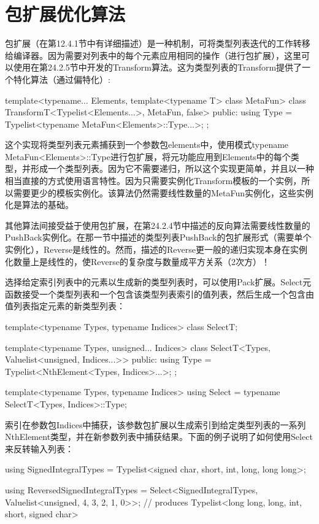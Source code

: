 \section{包扩展优化算法}
包扩展（在第12.4.1节中有详细描述）是一种机制，可将类型列表迭代的工作转移给编译器。因为需要对列表中的每个元素应用相同的操作（进行包扩展），这里可以使用在第24.2.5节中开发的Transform算法。这为类型列表的Transform提供了一个特化算法（通过偏特化）:

\begin{cpp}
template<typename... Elements, template<typename T> class MetaFun>
class TransformT<Typelist<Elements...>, MetaFun, false> {
	public:
	using Type = Typelist<typename MetaFun<Elements>::Type...>;
};
\end{cpp}

这个实现将类型列表元素捕获到一个参数包elements中，使用模式typename MetaFun<Elements>::Type进行包扩展，将元功能应用到Elements中的每个类型，并形成一个类型列表。因为它不需要递归，所以这个实现更简单，并且以一种相当直接的方式使用语言特性。因为只需要实例化Transform模板的一个实例，所以需要更少的模板实例化。该算法仍然需要线性数量的MetaFun实例化，这些实例化是算法的基础。

其他算法间接受益于使用包扩展，在第24.2.4节中描述的反向算法需要线性数量的PushBack实例化。在那一节中描述的类型列表PushBack的包扩展形式（需要单个实例化），Reverse是线性的。然而，描述的Reverse更一般的递归实现本身在实例化数量上是线性的，使Reverse的复杂度与数量成平方关系（2次方）！

选择给定索引列表中的元素以生成新的类型列表时，可以使用Pack扩展。Select元函数接受一个类型列表和一个包含该类型列表索引的值列表，然后生成一个包含由值列表指定元素的新类型列表：

\begin{cpp}
template<typename Types, typename Indices>
class SelectT;

template<typename Types, unsigned... Indices>
class SelectT<Types, Valuelist<unsigned, Indices...>> {
	public:
	using Type = Typelist<NthElement<Types, Indices>...>;
};

template<typename Types, typename Indices>
using Select = typename SelectT<Types, Indices>::Type;
\end{cpp}

索引在参数包Indices中捕获，该参数包扩展以生成索引到给定类型列表的一系列NthElement类型，并在新参数列表中捕获结果。下面的例子说明了如何使用Select来反转输入列表：

\begin{cpp}
using SignedIntegralTypes =
	Typelist<signed char, short, int, long, long long>;

using ReversedSignedIntegralTypes =
	Select<SignedIntegralTypes, Valuelist<unsigned, 4, 3, 2, 1, 0>>;
	// produces Typelist<long long, long, int, short, signed char>
\end{cpp}

